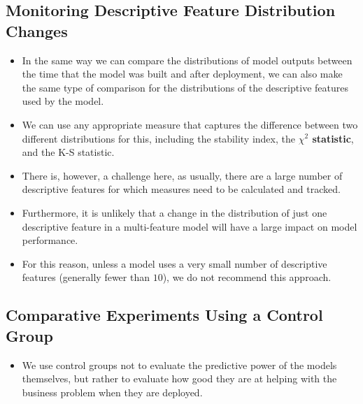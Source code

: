 \documentclass[xcolor={table}]{beamer}
\newcommand{\indexkeyword}[1]{\alert{\textbf{#1}\index{#1}}}
\begin{document}
\subsection{Monitoring Descriptive Feature Distribution Changes}

\begin{frame}
	\begin{itemize}
		\item In the same way we can compare the distributions of model outputs between the time that the model was built and after deployment, we can also make the same type of comparison for the distributions of the descriptive features used by the model.  
		\item We can use any appropriate measure that captures the difference between two different distributions for this, including the stability index, the \indexkeyword{$\chi^2$ statistic}, and the \alert{K-S statistic}. 
	\end{itemize}
\end{frame}

\begin{frame}
	\begin{itemize}
		\item There is, however, a challenge here, as usually, there are a large number of descriptive features for which measures need to be calculated and tracked. 
		\item Furthermore, it is unlikely that a change in the distribution of just one descriptive feature in a multi-feature model will have a large impact on model performance. 
		\item For this reason, unless a model uses a very small number of descriptive features  (generally fewer than $10$), we do not recommend this approach.
	\end{itemize}
\end{frame}

\subsection{Comparative Experiments Using a Control Group}

\begin{frame}
	\begin{itemize}
		\item We use control groups not to evaluate the predictive power of the models themselves, but rather to evaluate how good they are at helping with the business problem when they are deployed.
	\end{itemize}
\end{frame}
\end{document}
